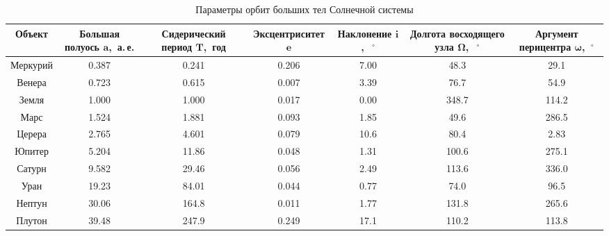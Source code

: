 
\begin{table}[h!]
	\scriptsize
	\renewcommand{\arraystretch}{1.5}
	\renewcommand{\tabcolsep}{1pt}
	\centering
	\begin{tabularx}{\tw}{|C{.13}|C{.125}|C{.15}|C{.125}|C{.115}|C{.16}|C{.15}|}
		\hline
		\quad\quad\quad Объект &  Большая полуось  $\mathbf{a}$,~а.\,е. & Сиде\-ри\-чес\-кий пе\-риод $\mathbf{T}$,~год & Эксцен\-триситет $\mathbf{e}$ & Накло\-нение $\mathbf{i}$,~$~^\circ$ & Долгота восходящего узла $\mathbf{\Omega}$,~$~^\circ$ & Аргумент перицентра $\boldsymbol{\omega} $, $~^\circ$\\
		\hline
		Меркурий & 0.387 & 0.241 & 0.206 & 7.00  & 48.3  & 29.1\\
		
		Венера	 & 0.723 & 0.615 & 0.007 & 3.39  & 76.7  & 54.9\\
		
		Земля    & 1.000 & 1.000 & 0.017 & 0.00    & 348.7 & 114.2\\
		
		Марс     & 1.524 & 1.881  & 0.093 & 1.85  & 49.6  & 286.5\\
		
		Церера   & 2.765 & 4.601  & 0.079 & 10.6 & 80.4  & 2.83\\
		
		Юпитер   & 5.204 & 11.86 & 0.048 & 1.31  & 100.6 & 275.1\\
		
		Сатурн   & 9.582 & 29.46 & 0.056 & 2.49  & 113.6 & 336.0\\
		
		Уран     & 19.23 & 84.01 & 0.044 & 0.77  & 74.0  & 96.5\\
		
		Нептун   & 30.06  & 164.8 & 0.011 & 1.77  & 131.8 & 265.6\\
		
		Плутон   & 39.48 & 247.9 & 0.249 & 17.1 & 110.2 & 113.8\\
		\hline
	\end{tabularx}
	\caption{Параметры орбит больших тел Солнечной системы}
\end{table}
